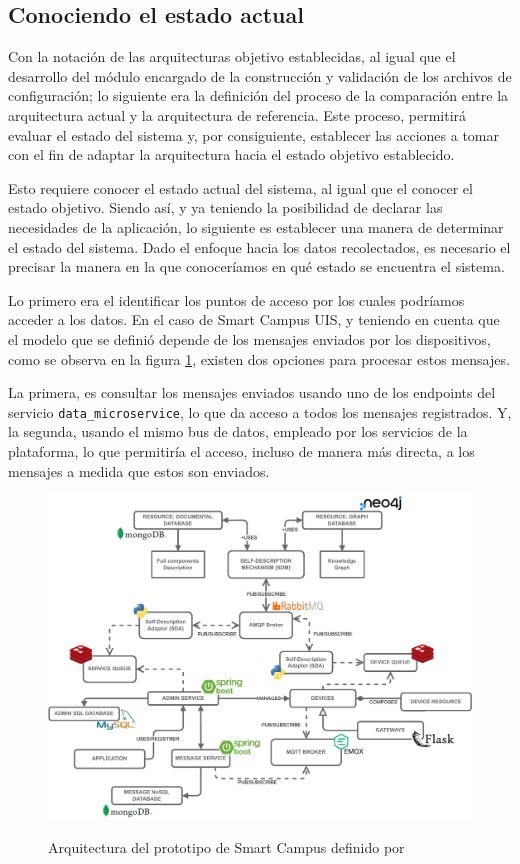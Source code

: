 \subsection{Conociendo el estado actual}

Con la notación de las arquitecturas objetivo establecidas, al igual que el desarrollo del módulo encargado de la construcción y validación de los archivos de configuración; lo siguiente era la definición del proceso de la comparación entre la arquitectura actual y la arquitectura de referencia. Este proceso, permitirá evaluar el estado del sistema y, por consiguiente, establecer las acciones a tomar con el fin de adaptar la arquitectura hacia el estado objetivo establecido.

Esto requiere conocer el estado actual del sistema, al igual que el conocer el estado objetivo. Siendo así, y ya teniendo la posibilidad de declarar las necesidades de la aplicación, lo siguiente es establecer una manera de determinar el estado del sistema. Dado el enfoque hacia los datos recolectados, es necesario el precisar la manera en la que conoceríamos en qué estado se encuentra el sistema.

Lo primero era el identificar los puntos de acceso por los cuales podríamos acceder a los datos. En el caso de Smart Campus UIS, y teniendo en cuenta que el modelo que se definió depende de los mensajes enviados por los dispositivos, como se observa en la figura \ref{fig:ArquitecturaSmartCampus}, existen dos opciones para procesar estos mensajes. 

La primera, es consultar los mensajes enviados usando uno de los endpoints del servicio \texttt{data\_microservice}, lo que da acceso a todos los mensajes registrados. Y, la segunda, usando el mismo bus de datos, empleado por los servicios de la plataforma, lo que permitiría el acceso, incluso de manera más directa, a los mensajes a medida que estos son enviados.

\begin{figure}[ht]
    \centering
    \caption{Arquitectura del prototipo de Smart Campus definido por }
    \includegraphics[width=\linewidth]{images/ArquitecturaSmartCampusUis.pdf}
    \label{fig:ArquitecturaSmartCampus}
\end{figure}

